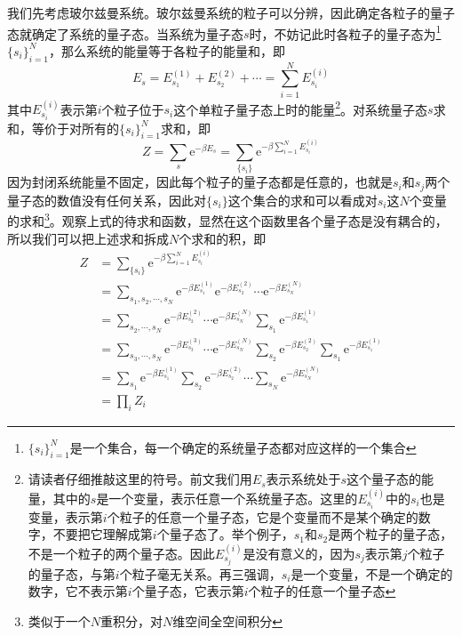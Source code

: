 \documentclass[../../main.tex]{subfiles}
\begin{document}
我们先考虑玻尔兹曼系统。玻尔兹曼系统的粒子可以分辨，因此确定各粒子的量子态就确定了系统的量子态。当系统为量子态\(s\)时，不妨记此时各粒子的量子态为\footnote{\(\{s_i\}_{i=1}^{N}\)是一个集合，每一个确定的系统量子态都对应这样的一个集合}\(\{s_i\}_{i=1}^{N}\)，那么系统的能量等于各粒子的能量和，即
\begin{equation}
    E_s=E_{s_1}^{(1)}+E_{s_2}^{(2)}+\cdots=\sum_{i=1}^{N}E_{s_i}^{(i)}
\end{equation}
其中\(E_{s_i}^{(i)}\)表示第\(i\)个粒子位于\(s_i\)这个单粒子量子态上时的能量\footnote{\label{fn:组合配分函数之单粒子量子态}请读者仔细推敲这里的符号。前文我们用\(E_s\)表示系统处于\(s\)这个量子态的能量，其中的\(s\)是一个变量，表示任意一个系统量子态。这里的\(E_{s_i}^{(i)}\)中的\(s_i\)也是变量，表示第\(i\)个粒子的任意一个量子态，它是个变量而不是某个确定的数字，不要把它理解成第\(i\)个量子态了。举个例子，\(s_1\)和\(s_2\)是两个粒子的量子态，不是一个粒子的两个量子态。因此\(E_{s_j}^{(i)}\)是没有意义的，因为\(s_j\)表示第\(j\)个粒子的量子态，与第\(i\)个粒子毫无关系。再三强调，\(s_i\)是一个变量，不是一个确定的数字，它不表示第\(i\)个量子态，它表示第\(i\)个粒子的任意一个量子态}。对系统量子态\(s\)求和，等价于对所有的\(\{s_i\}_{i=1}^{N}\)求和，即
\begin{equation}
    Z=\sum_s\mathrm{e}^{-\beta E_s}=\sum_{\{s_i\}}\mathrm{e}^{-\beta \sum_{i=1}^{N}E_{s_i}^{(i)}}
\end{equation}
因为封闭系统能量不固定，因此每个粒子的量子态都是任意的，也就是\(s_i\)和\(s_j\)两个量子态的数值没有任何关系，因此对\(\{s_i\}\)这个集合的求和可以看成对\(s_i\)这\(N\)个变量的求和\footnote{类似于一个\(N\)重积分，对\(N\)维空间全空间积分}。观察上式的待求和函数，显然在这个函数里各个量子态是没有耦合的，所以我们可以把上述求和拆成\(N\)个求和的积，即
\begin{equation}\label{eq:组合配分函数之玻尔兹曼系统}
    \begin{split}
        Z&=\sum_{\{s_i\}}\mathrm{e}^{-\beta \sum_{i=1}^{N}E_{s_i}^{(i)}} \\
        &=\sum_{s_1,s_2,\cdots,s_N}\mathrm{e}^{-\beta E_{s_1}^{(1)}}\mathrm{e}^{-\beta E_{s_2}^{(2)}}\cdots\mathrm{e}^{-\beta E_{s_N}^{(N)}} \\
        &=\sum_{s_2,\cdots,s_N}\mathrm{e}^{-\beta E_{s_2}^{(2)}}\cdots\mathrm{e}^{-\beta E_{s_N}^{(N)}}\sum_{s_1}\mathrm{e}^{-\beta E_{s_1}^{(1)}} \\
        &=\sum_{s_3,\cdots,s_N}\mathrm{e}^{-\beta E_{s_3}^{(3)}}\cdots\mathrm{e}^{-\beta E_{s_N}^{(N)}}\sum_{s_2}\mathrm{e}^{-\beta E_{s_2}^{(2)}}\sum_{s_1}\mathrm{e}^{-\beta E_{s_1}^{(1)}}\\
        &=\sum_{s_1}\mathrm{e}^{-\beta E_{s_1}^{(1)}}\sum_{s_2}\mathrm{e}^{-\beta E_{s_2}^{(2)}}\cdots\sum_{s_N}\mathrm{e}^{-\beta E_{s_N}^{(N)}} \\
        &=\prod_{i}Z_{i}
    \end{split}
\end{equation}
\end{document}
